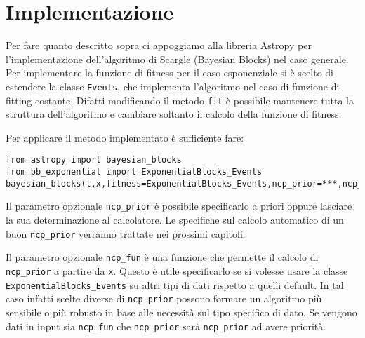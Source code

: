 \documentclass[10pt,a4paper]{report}
\begin{document}
\section{Implementazione}
Per fare quanto descritto sopra ci appoggiamo alla libreria Astropy per l'implementazione dell'algoritmo di Scargle (Bayesian Blocks) nel caso generale. Per implementare la funzione di fitness per il caso esponenziale si è scelto di estendere la classe \texttt{Events}, che implementa l'algoritmo nel caso di funzione di fitting costante. Difatti modificando il metodo \texttt{fit} è possibile mantenere tutta la struttura dell'algoritmo e cambiare soltanto il calcolo della funzione di fitness.

Per applicare il metodo implementato è sufficiente fare:
\begin{verbatim}
from astropy import bayesian_blocks
from bb_exponential import ExponentialBlocks_Events
bayesian_blocks(t,x,fitness=ExponentialBlocks_Events,ncp_prior=***,ncp_fun=***)
\end{verbatim}
Il parametro opzionale \texttt{ncp\_prior} è possibile specificarlo a priori oppure lasciare la sua determinazione al calcolatore. Le specifiche sul calcolo automatico di un buon \texttt{ncp\_prior} verranno trattate nei prossimi capitoli.

Il parametro opzionale \texttt{ncp\_fun} è una funzione che permette il calcolo di \texttt{ncp\_prior} a partire da \texttt{x}. Questo è utile specificarlo se si volesse usare la classe \texttt{ExponentialBlocks\_Events} su altri tipi di dati rispetto a quelli default. In tal caso infatti scelte diverse di \texttt{ncp\_prior} possono formare un algoritmo più sensibile o più robusto in base alle necessità sul tipo specifico di dato. Se vengono dati in input sia \texttt{ncp\_fun} che \texttt{ncp\_prior} sarà \texttt{ncp\_prior} ad avere priorità.
\end{document}
